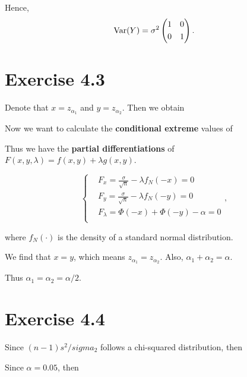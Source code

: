 Hence,
\begin{align*}
    \text{Var}(Y)=\sigma^2\left(\begin{aligned}&1&0\\&0&1\end{aligned}\right).
\end{align*}

\section*{Exercise 4.3}
Denote that $x=z_{\alpha_1}$ and $y=z_{\alpha_2}$. Then we obtain

Now we want to calculate the \textbf{conditional extreme} values of

Thus we have the \textbf{partial differentiations} of $F(x,y,\lambda)=f(x,y)+\lambda g(x,y)$.

\[
    \left\{\begin{aligned}
        &F_x=\frac{\sigma}{\sqrt{n}}-\lambda f_N(-x)=0\\
        &F_y=\frac{\sigma}{\sqrt{n}}-\lambda f_N(-y)=0\\
        &F_\lambda=\Phi(-x)+\Phi(-y)-\alpha=0\\
    \end{aligned}\right. ,
\]

where $f_N(\cdot)$ is the density of a standard normal distribution.

We find that $x=y$, which means $z_{\alpha_1}=z_{\alpha_2}$. Also, $\alpha_1+\alpha_2=\alpha$.

Thus $\alpha_1=\alpha_2=\alpha/2$.

\section*{Exercise 4.4}
Since $(n-1)s^2/sigma_2$ follows a chi-squared distribution, then

Since $\alpha=0.05$, then

